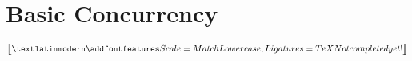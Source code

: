 \chapter{Basic Concurrency}\label{ch:concurrency}

$\big\llbracket \fEn{Not completed yet!} \big\rrbracket$
